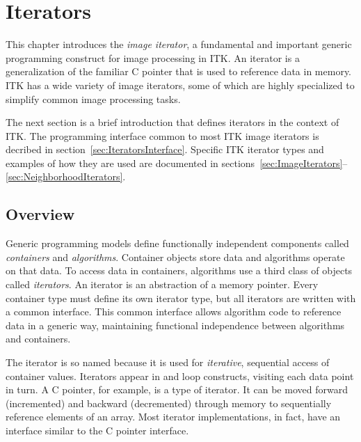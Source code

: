 \chapter{Iterators}





This chapter introduces the \emph{image iterator}, a fundamental and important
generic programming construct for image processing in ITK.  An iterator is a
generalization of the familiar C pointer that is used to reference data in
memory.  ITK has a wide variety of image iterators, some of which are highly
specialized to simplify common image processing tasks.

The next section is a brief introduction that defines iterators in the
context of ITK.  The programming interface common to most ITK image iterators
is decribed in section~\ref{sec:IteratorsInterface}.  Specific ITK iterator
types and examples of how they are used are documented in
sections~\ref{sec:ImageIterators}--\ref{sec:NeighborhoodIterators}.

\section{Overview}
\label{sec:IteratorsIntroduction}
Generic programming models define functionally independent components called
\emph{containers} and \emph{algorithms}.  Container objects store data and
algorithms operate on that data.  To access data in containers, algorithms use
a third class of objects called \emph{iterators}.  An iterator is an
abstraction of a memory pointer.  Every container type must define its own
iterator type, but all iterators are written with a common interface.  This
common interface allows algorithm code to reference data in a generic way,
maintaining functional independence between algorithms and containers.

The iterator is so named because it is used for \emph{iterative}, sequential
access of container values.  Iterators appear in  and
 loop constructs, visiting each data point in turn.  A C pointer,
for example, is a type of iterator.  It can be moved forward (incremented) and
backward (decremented) through memory to sequentially reference elements of an
array. Most iterator implementations, in fact, have an interface similar to the
C pointer interface. 

